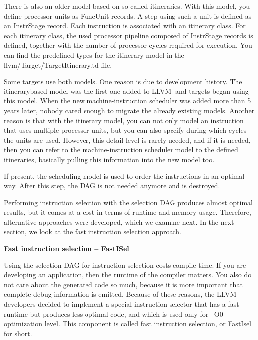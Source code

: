 There is also an older model based on so-called itineraries. With this model, you define processor units as FuncUnit records. A step using such a unit is defined as an InstrStage record. Each instruction is associated with an itinerary class. For each itinerary class, the used processor pipeline composed of InstrStage records is defined, together with the number of processor cycles required for execution. You can find the predefined types for the itinerary model in the llvm/Target/TargetItinerary.td file.\par

Some targets use both models. One reason is due to development history. The itinerarybased model was the first one added to LLVM, and targets began using this model. When the new machine-instruction scheduler was added more than 5 years later, nobody cared enough to migrate the already existing models. Another reason is that with the itinerary model, you can not only model an instruction that uses multiple processor units, but you can also specify during which cycles the units are used. However, this detail level is rarely needed, and if it is needed, then you can refer to the machine-instruction scheduler model to the defined itineraries, basically pulling this information into the new model too.\par

If present, the scheduling model is used to order the instructions in an optimal way. After this step, the DAG is not needed anymore and is destroyed.\par

Performing instruction selection with the selection DAG produces almost optimal results, but it comes at a cost in terms of runtime and memory usage. Therefore, alternative approaches were developed, which we examine next. In the next section, we look at the fast instruction selection approach.\par

\hspace*{\fill} \par %
\textbf{Fast instruction selection – FastISel}

Using the selection DAG for instruction selection costs compile time. If you are developing an application, then the runtime of the compiler matters. You also do not care about the generated code so much, because it is more important that complete debug information is emitted. Because of these reasons, the LLVM developers decided to implement a special instruction selector that has a fast runtime but produces less optimal code, and which is used only for –O0 optimization level. This component is called fast instruction selection, or FastIsel for short.\par


